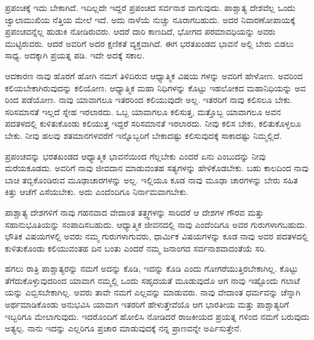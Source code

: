 ಪ್ರಪಂಚಕ್ಕೆ ಇದು ಬೇಕಾಗಿದೆ. ಇದಿಲ್ಲದೇ ಇದ್ದರೆ ಪ್ರಪಂಚದ ಸರ್ವನಾಶ ವಾಗುವುದು. ಪಾಶ್ಚಾತ್ಯ ದೇಶವೆಲ್ಲ ಒಂದು ಜ್ವಾಲಾಮುಖಿಯ ನೆತ್ತಿಯ ಮೇಲೆ ಇದೆ. ಅದು ನಾಳೆಯೆ ನುಚ್ಚು ನೂರಾಗಬಹುದು. ಅದರ ನಿವಾರಣೋಪಾಯಕ್ಕೆ ಪ್ರಪಂಚವನ್ನೆಲ್ಲ ಹುಡುಕಿ ನೋಡಿರುವರು. ಆದರೆ ದಾರಿ ಕಾಣದಿದೆ, ಭೋಗದ ಪರಮಾವಧಿಯನ್ನು ಅವರು ಮುಟ್ಟಿರುವರು. ಆದರೆ ಅವರಿಗೆ ಅದರ ಕ್ಷಣಿಕತೆ ವ್ಯಕ್ತವಾಗಿದೆ. ಈಗ ಭರತಖಂಡದ ಭಾವನೆ ಅಲ್ಲಿ ಬೇರು ಬಿಡಲು ಸಾಧ್ಯ. ಅದಕ್ಕಾಗಿ ಪ್ರಯತ್ನ ಪಡಿ. ಇದೇ ಅದಕ್ಕೆ ಸಕಾಲ.

ಆದಕಾರಣ ನಾವು ಹೊರಗೆ ಹೋಗಿ ನಮಗೆ ತಿಳಿದಿರುವ ಆಧ್ಯಾತ್ಮಿಕ ವಿಷಯ ಗಳನ್ನು ಅವರಿಗೆ ಹೇಳೋಣ. ಅವರಿಂದ ಕಲಿಯಬೇಕಾಗಿರುವುದನ್ನು ಕಲಿಯೋಣ. ಆಧ್ಯಾತ್ಮಿಕ ಮಹಾ ನಿಧಿಗಳನ್ನು ಕೊಟ್ಟು ಇಹಲೋಕದ ಮಹಾನಿಧಿಯನ್ನು ಅವ ರಿಂದ ಪಡೆಯೋಣ. ನಾವು ಯಾವಾಗಲೂ ಇತರರಿಂದ ಕಲಿಯುವುದೇ ಅಲ್ಲ. ಇತರರಿಗೆ ನಾವು ಕಲಿಸಲೂ ಬೇಕು. ಸರಿಸಮಾನತೆ ಇಲ್ಲದೆ ಸ್ನೇಹ ಇರಲಾರದು. ಒಬ್ಬ ಯಾವಾಗಲೂ ಕಲಿಸುತ್ತ, ಮತ್ತೊಬ್ಬ ಯಾವಾಗಲೂ ಅವನ ಪದತಳದಲ್ಲಿ ಕುಳಿತುಕೊಂಡು ಕಲಿಯುತ್ತ ಇದ್ದರೆ ಸರಿಸಮಾನತೆ ಇರಲಾರದು. ನೀವು ಕಲಿಸ ಬೇಕು, ಕಲಿತುಕೊಳ್ಳಲೂ ಬೇಕು. ನೀವು ಹಲವು ಶತಮಾನಗಳವರೆಗೆ ಇನ್ನೊಬ್ಬರಿಗೆ ಬೇಕಾದಷ್ಟು ಕಲಿಸುವುದಕ್ಕೆ ಸಾಕಾದಷ್ಟು ನಿಮ್ಮಲ್ಲಿದೆ.

ಪ್ರಪಂಚವನ್ನು ಭರತಖಂಡದ ಆಧ್ಯಾತ್ಮಿಕ ಭಾವನೆಯಿಂದ ಗೆಲ್ಲಬೇಕು ಎಂದರೆ ಏನು ಎಂಬುದನ್ನು ನೀವು ಮರೆಯಕೂಡದು. ಅವರಿಗೆ ನಾವು ಜೀವದಾನ ಮಾಡುವಂತಹ ಸತ್ಯಗಳನ್ನು ಹೇಳಿಕೊಡಬೇಕು. ಬಹು ಕಾಲದಿಂದ ನಾವು ಬಾಚಿ ತಬ್ಬಿಕೊಂಡಿರುವ ಮೂಢಾಚಾರಗಳನ್ನು ಅಲ್ಲ. ಇಲ್ಲಿಯೂ ಕೂಡ ನಾವು ಮೂಢಾ ಚಾರಗಳನ್ನು ಬೇರು ಸಹಿತ ಕಿತ್ತು ಆಚೆಗೆ ಎಸೆಯಬೇಕು. ಅದು ಎಂದೆಂದಿಗೂ ನಿರ್ನಾಮವಾಗಬೇಕು.

ಪಾಶ್ಚಾತ್ಯ ದೇಶಗಳಿಗೆ ನಾವು ಗಹನವಾದ ವೇದಾಂತ ತತ್ತ್ವಗಳನ್ನು ಸಾರಿದರೆ ಆ ದೇಶಗಳ ಗೌರವ ಮತ್ತು ಸಹಾನುಭೂತಿಯನ್ನು ಸಂಪಾದಿಸಬಹುದು. ಆಧ್ಯಾತ್ಮಿಕ ಜೀವನದಲ್ಲಿ ನಾವು ಎಂದೆಂದಿಗೂ ಅವರ ಗುರುಗಳಾಗಬಹುದು. ಭೌತಿಕ ವಿಷಯಗಳಲ್ಲಿ ಅವರು ನಮ್ಮ ಗುರುಗಳಾಗುವರು, ಧಾರ್ಮಿಕ ವಿಷಯಗಳನ್ನು ಕೂಡ ನಾವು ಅವರ ಪದತಳದಲ್ಲಿ ಕುಳಿತುಕೊಂಡು ಕಲಿಯುವಂತಹ ದಿನ ಬಂತು ಎಂದರೆ ನಮ್ಮ ಜನಾಂಗದ ಸರ್ವನಾಶವಾದಂತೆಯೆ ಸರಿ.

ಹಗಲು ರಾತ್ರಿ ಪಾಶ್ಚಾತ್ಯರನ್ನು ನಮಗೆ ಅದನ್ನು ಕೊಡಿ, ಇದನ್ನು ಕೊಡಿ ಎಂದು ಗೋಗರೆಯುತ್ತಿರಬೇಕಾಗಿಲ್ಲ. ಕೊಟ್ಟು ತೆಗೆದುಕೊಳ್ಳುವುದರಿಂದ ಯಾವಾಗ ನಮ್ಮಲ್ಲಿ ಒಂದು ಸಹೃದಯತೆ ಮೂಡುವುದೊ ಆಗ ನಾವು ಇಷ್ಟೊಂದು ಗಲಾಟೆ ಯನ್ನು ಎಬ್ಬಿಸಬೇಕಾಗಿಲ್ಲ. ಅವರು ತಾವೇ ನಮಗೆ ಎಲ್ಲವನ್ನು ಮಾಡುವರು. ನಾವು ವೇದಾಂತ ಧರ್ಮವನ್ನು ಚೆನ್ನಾಗಿ ಅರ್ಥಮಾಡಿಕೊಂಡು ಅನುಭವಿಸಿ ಯಾವಾಗ ಇತರರಿಗೆ ಹೇಳುತ್ತೇವೆಯೊ ಆಗ ಭಾರತೀಯ ಮತ್ತು ಪಾಶ್ಚಾತ್ಯರಿಗೆ ಇಬ್ಬರಿಗೂ ಮೇಲಾಗುವುದು. ಇದರೊಂದಿಗೆ ಹೋಲಿಸಿ ನೋಡಿದರೆ ರಾಜಕೀಯದ ಪ್ರಯತ್ನ ಗಳಿಂದ ನಮಗೆ ಬರುವುದು ಅತ್ಯಲ್ಪ. ನಾನು ಇದನ್ನು ಎಲ್ಲರಿಗೂ ಪ್ರಚಾರ ಮಾಡುವುದಕ್ಕೆ ನನ್ನ ಪ್ರಾಣವನ್ನೇ ಅರ್ಪಿಸುತ್ತೇನೆ.

